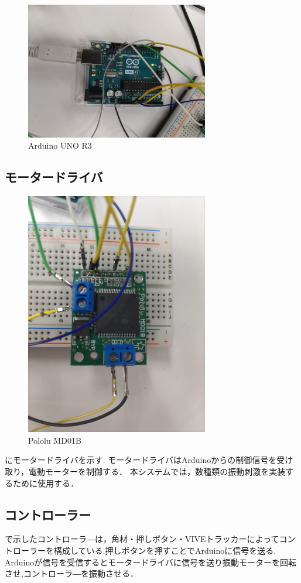 \begin{figure}[h]
\centering
\includegraphics[clip,width=8cm]{./fig/Arduino.png}
\caption{Arduino UNO R3}\label{arduino}
\end{figure}

\subsection{モータードライバ}

\begin{figure}[h]
\centering
\includegraphics[clip,width=8cm]{./fig/pololuMD01B.png}
\caption{Pololu MD01B}\label{polo}
\end{figure}

にモータードライバを示す.
モータードライバはArduinoからの制御信号を受け取り，電動モーターを制御する．
本システムでは，数種類の振動刺激を実装するために使用する．

\subsection{コントローラー}
で示したコントローラ―は，角材・押しボタン・VIVEトラッカーによってコントローラーを構成している.押しボタンを押すことでArduinoに信号を送る.
Arduinoが信号を受信するとモータードライバに信号を送り振動モーターを回転させ,コントローラ―を振動させる．



